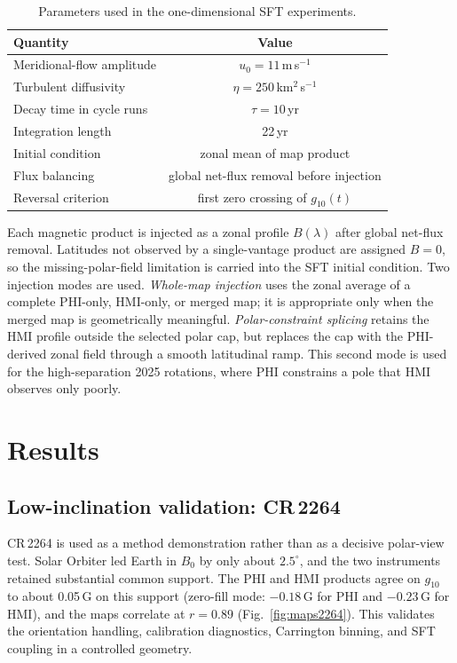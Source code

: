 \documentclass{aa}
\begin{document}
\begin{table}
\caption{Parameters used in the one-dimensional SFT experiments.}
\label{tab:sft-params}
\centering
\footnotesize
\begin{tabular}{lc}
\hline\hline
Quantity & Value \\
\hline
Meridional-flow amplitude & $u_0=11$\,m\,s$^{-1}$ \\
Turbulent diffusivity & $\eta=250$\,km$^2$\,s$^{-1}$ \\
Decay time in cycle runs & $\tau=10$\,yr \\
Integration length & 22\,yr \\
Initial condition & zonal mean of map product \\
Flux balancing & global net-flux removal before injection \\
Reversal criterion & first zero crossing of $g_{10}(t)$ \\
\hline
\end{tabular}
\end{table}

Each magnetic product is injected as a zonal profile $B(\lambda)$ after global net-flux removal. Latitudes not observed by a single-vantage product are assigned $B=0$, so the missing-polar-field limitation is carried into the SFT initial condition. Two injection modes are used. \emph{Whole-map injection} uses the zonal average of a complete PHI-only, HMI-only, or merged map; it is appropriate only when the merged map is geometrically meaningful. \emph{Polar-constraint splicing} retains the HMI profile outside the selected polar cap, but replaces the cap with the PHI-derived zonal field through a smooth latitudinal ramp. This second mode is used for the high-separation 2025 rotations, where PHI constrains a pole that HMI observes only poorly.

\section{Results}
\label{sec:results}

\subsection{Low-inclination validation: CR\,2264}
\label{sec:results-demo}

CR\,2264 is used as a method demonstration rather than as a decisive polar-view test. Solar Orbiter led Earth in $B_0$ by only about $2.5^{\circ}$, and the two instruments retained substantial common support. The PHI and HMI products agree on $g_{10}$ to about 0.05\,G on this support (zero-fill mode: $-0.18$\,G for PHI and $-0.23$\,G for HMI), and the maps correlate at $r=0.89$ (Fig.~\ref{fig:maps2264}). This validates the orientation handling, calibration diagnostics, Carrington binning, and SFT coupling in a controlled geometry.
\end{document}
